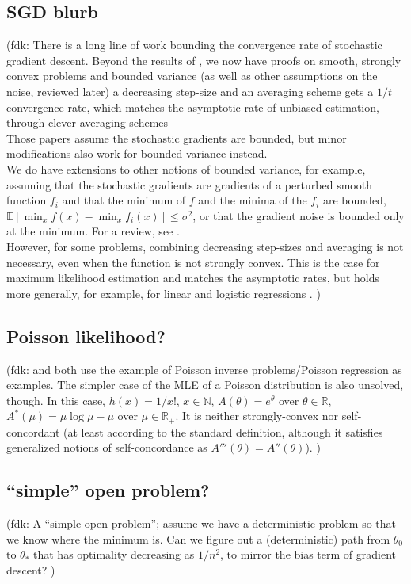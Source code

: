 \documentclass[twoside]{article}
\newcommand{\fdk}[1]{\textcolor{Periwinkle}{(fdk:#1)}}
\newcommand*{\expect}[2][]{\ensuremath{\mathbb{E}_{#1} \left[ #2 \right] }} %
\newcommand{\m}{\mu}
\begin{document}
\subsection{SGD blurb}
\fdk{
%
There is a long line of work bounding the convergence rate of stochastic gradient descent.
Beyond the results of \citet{robbins1951stochastic},
we now have proofs on smooth, strongly convex problems and bounded variance
(as well as other assumptions on the noise, reviewed later)
a decreasing step-size and an averaging scheme gets
a $1/t$ convergence rate,
which matches the asymptotic rate of unbiased estimation,
through clever averaging schemes \citep{rakhlin2012making,lacostejulien2012simpler}
\\
Those papers assume the stochastic gradients are bounded,
but minor modifications also work for bounded variance instead.
\\
We do have extensions to other notions of bounded variance,
for example, assuming that the stochastic gradients are gradients of a perturbed smooth function $f_i$
and that the minimum of $f$ and the minima of the $f_i$
are bounded, $\expect{\min_x f(x) - \min_x f_i(x)} \leq \sigma^2$,
or that the gradient noise is bounded only at the minimum.
For a review, see \citet{gower2019sgd}.
\\
However, for some problems, combining decreasing step-sizes and averaging is not necessary,
even when the function is not strongly convex.
This is the case for maximum likelihood estimation and matches the asymptotic rates,
but holds more generally, for example, for linear and logistic regressions \citep{bach2013nonstronglyconvex,moulines2011non}.
}


\subsection{Poisson likelihood?}
\fdk{
\citet{bauschke2017descent} and \citet{hanzely2018fastest} both use the example of Poisson inverse problems/Poisson regression
as examples.
The simpler case of the MLE of a Poisson distribution is also unsolved, though.
In this case, $h(x) = 1/x!$, $x \in \mathbb{N}$, $A(\theta) = e^\theta$ over $\theta \in \mathbb{R}$,
$A^*(\m) = \m \log \m - \m$ over $\m \in \mathbb{R}_+$.
It is neither strongly-convex nor self-concordant (at least according to the standard definition,
although it satisfies generalized notions of self-concordance as $A'''(\theta) = A''(\theta)$).
}

\subsection{``simple'' open problem?}
\fdk{
A ``simple open problem'';
assume we have a deterministic problem so that we know where the minimum is.
Can we figure out a (deterministic) path from $\theta_0$ to $\theta_*$
that has optimality decreasing as $1/n^2$,
to mirror the bias term of gradient descent?
}
\end{document}

